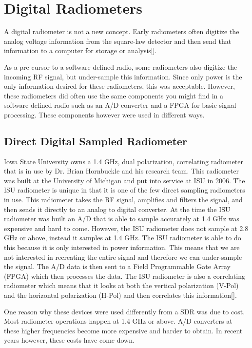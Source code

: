 \section{Digital Radiometers}



A digital radiometer is not a new concept.  Early radiometers often digitize the analog voltage information from the square-law detector and then send that information to a computer for storage or analysis[\cite{Ruf}].  

As a pre-cursor to a software defined radio, some radiometers also digitize the incoming RF signal, but under-sample this information.  Since only power is the only information desired for these radiometers, this was acceptable.  However, these radiometers did often use the same components you might find in a software defined radio such as an A/D converter and a FPGA for basic signal processing.  These components however were used in different ways.

\subsection{Direct Digital Sampled Radiometer}  
Iowa State University owns a 1.4 GHz, dual polarization, correlating radiometer that is in use by Dr. Brian Hornbuckle and his research team.  This radiometer was built at the University of Michigan and put into service at ISU in 2006.  The ISU radiometer is unique in that it is one of the few direct sampling radiometers in use\cite{Erbas}.  This radiometer takes the RF signal, amplifies and filters the signal, and then sends it directly to an analog to digital converter.  At the time the ISU radiometer was built an A/D that is able to sample accurately at 1.4 GHz was expensive and hard to come.  However, the ISU radiometer does not sample at 2.8 GHz or above, instead it samples at 1.4 GHz.  The ISU radiometer is able to do this because it is only interested in power information.  This means that we are not interested in recreating the entire signal and therefore we can under-sample the signal.  The A/D data is then sent to a Field Programmable Gate Array (FPGA) which then processes the data.  The ISU radiometer is also a correlating radiometer which means that it looks at both the vertical polarization (V-Pol) and the horizontal polarization (H-Pol) and then correlates this information[\cite{Fischman2001}]. 

One reason why these devices were used differently from a SDR was due to cost.  Most radiometer operations happen at 1.4 GHz or above.  A/D converters at these higher frequencies become more expensive and harder to obtain.  In recent years however, these costs have come down.

